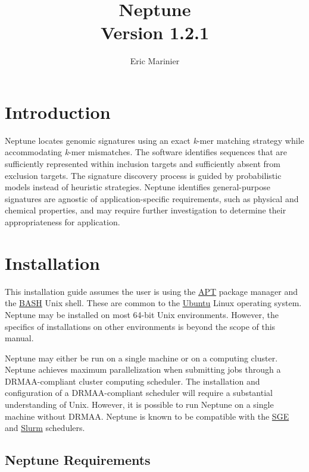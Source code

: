 \documentclass[a4paper,10pt]{article}
\title{Neptune\\ \normalsize Version 1.2.1}
\author{Eric Marinier}
\begin{document}
\maketitle

\newpage
\tableofcontents

\newpage
\section{Introduction}

Neptune locates genomic signatures using an exact \textit{k}-mer matching strategy while accommodating \textit{k}-mer mismatches. The software identifies sequences that are sufficiently represented within inclusion targets and sufficiently absent from exclusion targets. The signature discovery process is guided by probabilistic models instead of heuristic strategies. Neptune identifies general-purpose signatures are agnostic of application-specific requirements, such as physical and chemical properties, and may require further investigation to determine their appropriateness for application.

\newpage
\section{Installation}

This installation guide assumes the user is using the \href{https://help.ubuntu.com/community/AptGet/Howto}{APT} package manager and the \href{https://en.wikipedia.org/wiki/Bash_(Unix_shell)}{BASH} Unix shell. These are common to the \href{https://en.wikipedia.org/wiki/Ubuntu_(operating_system)}{Ubuntu} Linux operating system. Neptune may be installed on most 64-bit Unix environments. However, the specifics of installations on other environments is beyond the scope of this manual.

Neptune may either be run on a single machine or on a computing cluster. Neptune achieves maximum parallelization when submitting jobs through a DRMAA-compliant cluster computing scheduler. The installation and configuration of a DRMAA-compliant scheduler will require a substantial understanding of Unix. However, it is possible to run Neptune on a single machine without DRMAA. Neptune is known to be compatible with the \href{http://gridscheduler.sourceforge.net/}{SGE} and \href{http://slurm.schedmd.com/}{Slurm} schedulers.

\subsection{Neptune Requirements}
\end{document}
